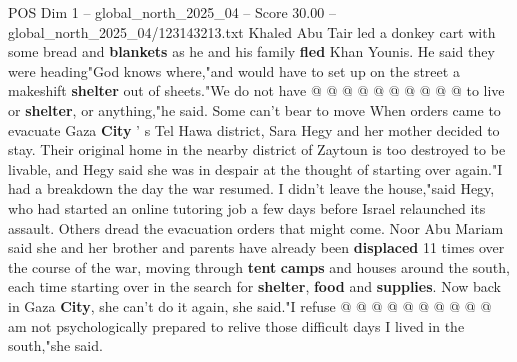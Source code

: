 \begin{textsample}{POS Dim 1 – global\_north\_2025\_04 – Score 30.00 – global\_north\_2025\_04/123143213.txt}
Khaled Abu Tair led a donkey cart with some bread and \textbf{blankets} as he and his family \textbf{fled} Khan Younis.
He said they were heading"God knows where,"and would have to set up on the street a makeshift \textbf{shelter} out of sheets."We do not have @ @ @ @ @ @ @ @ @ @ to live or \textbf{shelter}, or anything,"he said.
Some can't bear to move When orders came to evacuate Gaza \textbf{City} ' s Tel Hawa district, Sara Hegy and her mother decided to stay.
Their original home in the nearby district of Zaytoun is too destroyed to be livable, and Hegy said she was in despair at the thought of starting over again."I had a breakdown the day the war resumed.
I didn't leave the house,"said Hegy, who had started an online tutoring job a few days before Israel relaunched its assault.
Others dread the evacuation orders that might come.
Noor Abu Mariam said she and her brother and parents have already been \textbf{displaced} 11 times over the course of the war, moving through \textbf{tent} \textbf{camps} and houses around the south, each time starting over in the search for \textbf{shelter}, \textbf{food} and \textbf{supplies}.
Now back in Gaza \textbf{City}, she can't do it again, she said."I refuse @ @ @ @ @ @ @ @ @ @ am not psychologically prepared to relive those difficult days I lived in the south,"she said.

\end{textsample}
